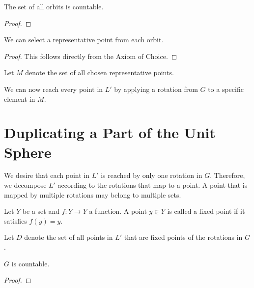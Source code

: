 \begin{lemma} \label{lemma:all_orbits_countable}
The set of all orbits is countable.
\end{lemma}
\begin{proof}
\end{proof}

\begin{lemma} \label{theorem:rep_points}
We can select a representative point from each orbit.
\end{lemma}
\begin{proof} 
This follows directly from the Axiom of Choice.
\end{proof}

\begin{definition} \label{def:set_rep_points} 
Let $M$ denote the set of all chosen representative points.
\end{definition}

We can now reach every point in $L'$ by applying a rotation from $G$ to a specific element in $M$.

\section{Duplicating a Part of the Unit Sphere}

We desire that each point in $L'$ is reached by only one rotation in $G$. Therefore, we decompose $L'$ according to the rotations that map to a point. A point that is mapped by multiple rotations may belong to multiple sets.

\begin{definition} \label{def:fixed_points}
Let $Y$ be a set and $f: Y \rightarrow Y$ a function. A point $y \in Y$ is called a fixed point if it satisfies $f(y) = y$.
\end{definition}

\begin{definition} \label{def:set_fixed_points} 
Let $D$ denote the set of all points in $L'$ that are fixed points of the rotations in $G$.
\end{definition}

\begin{lemma}[Countability of G] \label{lemma:G_countable}
$G$ is countable.
\end{lemma}
\begin{proof} 
\end{proof}

